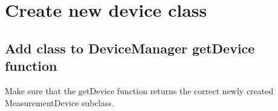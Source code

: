 
\section{Create new device class}
\subsection{Add class to DeviceManager getDevice function}
Make sure that the getDevice function returns the correct newly created MeasurementDevice subclass.

\newpage